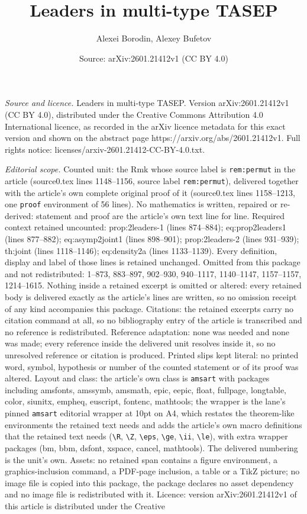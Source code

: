 \documentclass[10pt,a4paper]{amsart}
\title[Leaders in multi-type TASEP]{Leaders in multi-type TASEP}
\author{Alexei Borodin, Alexey Bufetov}
\date{Source: arXiv:2601.21412v1 (CC BY 4.0)}
\begin{document}
\maketitle

\noindent\emph{Source and licence.} Leaders in multi-type TASEP. Version arXiv:2601.21412v1 (CC BY 4.0), distributed under the Creative Commons Attribution 4.0 International licence, as recorded in the arXiv licence metadata for this exact version and shown on the abstract page https://arxiv.org/abs/2601.21412v1. Full rights notice: licenses/arxiv-2601.21412-CC-BY-4.0.txt.\par\smallskip

\noindent\textit{Editorial scope.} Counted unit: the Rmk whose source label is \texttt{rem:permut} in the article (source0.tex lines 1148--1156, source label \texttt{rem:permut}), delivered together with the article's own complete original proof of it (source0.tex lines 1158--1213, one \texttt{proof} environment of 56 lines). No mathematics is written, repaired or re-derived: statement and proof are the article's own text line for line. Required context retained uncounted: prop:2leaders-1 (lines 874--884); eq:prop2leaders1 (lines 877--882); eq:asymp2joint1 (lines 898--901); prop:2leaders-2 (lines 931--939); th:joint (lines 1118--1146); eq:density2a (lines 1133--1139). Every definition, display and label of those lines is retained unchanged. Omitted from this package and not redistributed: 1--873, 883--897, 902--930, 940--1117, 1140--1147, 1157--1157, 1214--1615. Nothing inside a retained excerpt is omitted or altered: every retained body is delivered exactly as the article's lines are written, so no omission receipt of any kind accompanies this package. Citations: the retained excerpts carry no citation command at all, so no bibliography entry of the article is transcribed and no reference is redistributed. Reference adaptation: none was needed and none was made; every reference inside the delivered unit resolves inside it, so no unresolved reference or citation is produced. Printed slips kept literal: no printed word, symbol, hypothesis or number of the counted statement or of its proof was altered. Layout and class: the article's own class is \texttt{amsart} with packages including amsfonts, amssymb, amsmath, epic, eepic, float, fullpage, longtable, color, siunitx, empheq, euscript, fontenc, mathtools; the wrapper is the lane's pinned \texttt{amsart} editorial wrapper at 10pt on A4, which restates the theorem-like environments the retained text needs and adds the article's own macro definitions that the retained text needs (\texttt{\textbackslash R}, \texttt{\textbackslash Z}, \texttt{\textbackslash eps}, \texttt{\textbackslash ge}, \texttt{\textbackslash ii}, \texttt{\textbackslash le}), with extra wrapper packages (bm, bbm, dsfont, xspace, cancel, mathtools). The delivered numbering is the unit's own. Assets: no retained span contains a figure environment, a graphics-inclusion command, a PDF-page inclusion, a table or a TikZ picture; no image file is copied into this package, the package declares no asset dependency and no image file is redistributed with it. Licence: version arXiv:2601.21412v1 of this article is distributed under the Creative 
\end{document}

